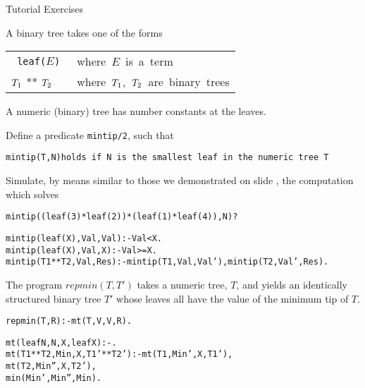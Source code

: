 \documentclass{popl}
\newcommand{\rmbox}[1]{\mbox{{\rm #1}}}
\begin{document}
\begin{exercises}
\begin{cframed}
Tutorial Exercises
\end{cframed}

A binary tree takes one of the forms
\begin{center}\begin{tabular}{ll}\tt
        leaf(\(E\))             &\rmbox{where \(E\) is a term}
        \\
        \(T\sb1\) ** \(T\sb2\)   &\rmbox{where \(T\sb1\), \(T\sb2\) are binary trees}
\end{tabular}

A numeric (binary) tree has number constants at the leaves.
\end{center}

\begin{ex}


Define a predicate {\tt mintip/2}, such that
\begin{alltt}
        mintip(T, N) \rmbox{holds if {\tt N} is the smallest leaf in the numeric tree {\tt T}}
\end{alltt}

Simulate, by means similar to those we demonstrated on slide \pageref{appendtrace}, the
computation which solves 
\begin{alltt}
        mintip((leaf(3)*leaf(2))*(leaf(1)*leaf(4)), N)?
\end{alltt}
\begin{ans}
\begin{alltt}
        mintip(leaf(X), Val, Val)   :- Val < X.
        mintip(leaf(X), Val, X)     :- Val >= X.
        mintip(T1 ** T2, Val, Res)  :- mintip(T1, Val, Val'), mintip(T2, Val', Res).
\end{alltt}
\end{ans}
\end{ex}
\begin{ex}
The  program $repmin(T, T')$  takes a numeric tree, $T$, and yields an 
identically structured binary tree $T'$ whose leaves all have the value of
the minimum tip of $T$.
\begin{alltt}
        repmin(T, R) :- mt(T, V, V, R).

        mt(leaf N,   N,   X,   leaf X)   :- .
        mt(T1 ** T2, Min, X,   T1'**T2') :- mt(T1,    Min',  X, T1'), 
                                            mt(T2,    Min'', X, T2'),
                                            min(Min', Min'', Min).


\end{alltt}
\end{ex}
\end{exercises}
\end{document}
